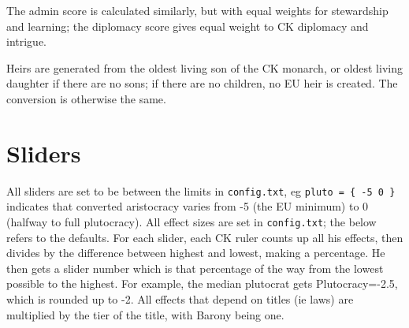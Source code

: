 \documentclass[12pt,ebook,oneside]{book}
\begin{document}
The admin score is calculated similarly, but with equal weights for
stewardship and learning; the diplomacy score gives equal weight to CK
diplomacy and intrigue. 

Heirs are generated from the oldest living son of the CK monarch, or
oldest living daughter if there are no sons; if there are no children,
no EU heir is created. The conversion is otherwise the same. 

\section{Sliders}

All sliders are set to be between the limits in \verb|config.txt|, 
eg \verb|pluto = { -5 0 }| indicates that converted aristocracy varies from -5
(the EU minimum) to 0 (halfway to full plutocracy). All effect sizes
are set in \verb|config.txt|; the below refers to the defaults. For
each slider, each CK ruler counts up all his effects, then divides by
the difference between highest and lowest, making a percentage. He
then gets a slider number which is that percentage of the way from the
lowest possible to the highest. For example, the median plutocrat 
gets Plutocracy=-2.5, which is rounded up to -2. All effects that
depend on titles (ie laws) are multiplied by the tier of the title,
with Barony being one. 
\end{document}
